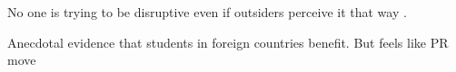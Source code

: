 \documentclass[
	letterpaper, %
]{jdf}
\begin{document}
No one is trying to be disruptive even if outsiders perceive it that way \cite{kim2014moocs}.

Anecdotal evidence that students in foreign countries benefit. But feels like PR move
\cite{agarwal2016moocs}



\printbibliography{}
\end{document}

